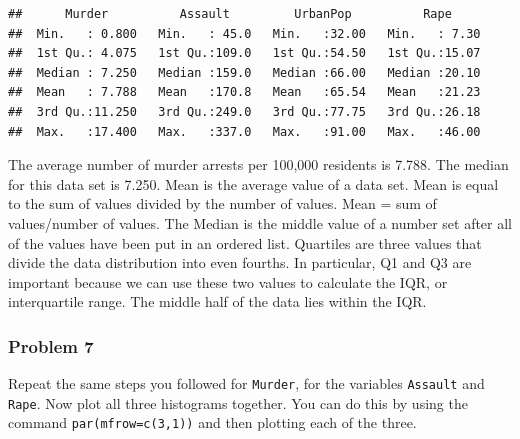 \documentclass[
]{article}
\newenvironment{Shaded}{\begin{snugshade}}{\end{snugshade}}
\newcommand{\AttributeTok}[1]{\textcolor[rgb]{0.77,0.63,0.00}{#1}}
\newcommand{\DecValTok}[1]{\textcolor[rgb]{0.00,0.00,0.81}{#1}}
\newcommand{\FunctionTok}[1]{\textcolor[rgb]{0.00,0.00,0.00}{#1}}
\newcommand{\NormalTok}[1]{#1}
\newcommand{\SpecialCharTok}[1]{\textcolor[rgb]{0.00,0.00,0.00}{#1}}
\newcommand{\StringTok}[1]{\textcolor[rgb]{0.31,0.60,0.02}{#1}}
\begin{document}
\begin{verbatim}
##      Murder          Assault         UrbanPop          Rape      
##  Min.   : 0.800   Min.   : 45.0   Min.   :32.00   Min.   : 7.30  
##  1st Qu.: 4.075   1st Qu.:109.0   1st Qu.:54.50   1st Qu.:15.07  
##  Median : 7.250   Median :159.0   Median :66.00   Median :20.10  
##  Mean   : 7.788   Mean   :170.8   Mean   :65.54   Mean   :21.23  
##  3rd Qu.:11.250   3rd Qu.:249.0   3rd Qu.:77.75   3rd Qu.:26.18  
##  Max.   :17.400   Max.   :337.0   Max.   :91.00   Max.   :46.00
\end{verbatim}

The average number of murder arrests per 100,000 residents is 7.788. The
median for this data set is 7.250. Mean is the average value of a data
set. Mean is equal to the sum of values divided by the number of values.
Mean = sum of values/number of values. The Median is the middle value of
a number set after all of the values have been put in an ordered list.
Quartiles are three values that divide the data distribution into even
fourths. In particular, Q1 and Q3 are important because we can use these
two values to calculate the IQR, or interquartile range. The middle half
of the data lies within the IQR.

\hypertarget{problem-7}{%
\subsubsection{Problem 7}\label{problem-7}}

Repeat the same steps you followed for \texttt{Murder}, for the
variables \texttt{Assault} and \texttt{Rape}. Now plot all three
histograms together. You can do this by using the command
\texttt{par(mfrow=c(3,1))} and then plotting each of the three.

\begin{Shaded}
\end{Shaded}
\end{document}
